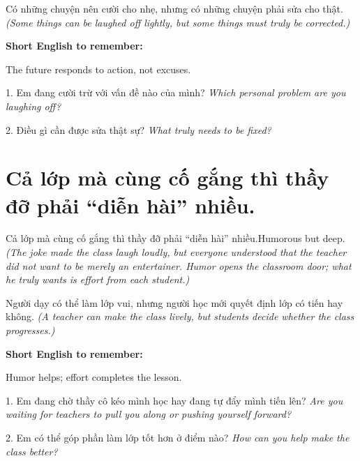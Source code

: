 \begin{baihoc}
Có những chuyện nên cười cho nhẹ, nhưng có những chuyện phải sửa cho thật.
\textit{(Some things can be laughed off lightly, but some things must truly be corrected.)}
\end{baihoc}

\begin{ghinhoanh}
\textbf{Short English to remember:}

The future responds to action, not excuses.

\end{ghinhoanh}

\begin{tuhocnhanh}
1. Em đang cười trừ với vấn đề nào của mình? \textit{Which personal problem are you laughing off?}

2. Điều gì cần được sửa thật sự? \textit{What truly needs to be fixed?}
\end{tuhocnhanh}
\ngancach

\section{Cả lớp mà cùng cố gắng thì thầy đỡ phải “diễn hài” nhiều.}
\begin{truyen}{Cả lớp mà cùng cố gắng thì thầy đỡ phải “diễn hài” nhiều.}{Humorous but deep.}
\textit{(The joke made the class laugh loudly, but everyone understood that the teacher did not want to be merely an entertainer. Humor opens the classroom door; what he truly wants is effort from each student.)}
\end{truyen}

\begin{baihoc}
Người dạy có thể làm lớp vui, nhưng người học mới quyết định lớp có tiến hay không.
\textit{(A teacher can make the class lively, but students decide whether the class progresses.)}
\end{baihoc}

\begin{ghinhoanh}
\textbf{Short English to remember:}

Humor helps; effort completes the lesson.

\end{ghinhoanh}

\begin{tuhocnhanh}
1. Em đang chờ thầy cô kéo mình học hay đang tự đẩy mình tiến lên? \textit{Are you waiting for teachers to pull you along or pushing yourself forward?}

2. Em có thể góp phần làm lớp tốt hơn ở điểm nào? \textit{How can you help make the class better?}
\end{tuhocnhanh}
\ngancach

